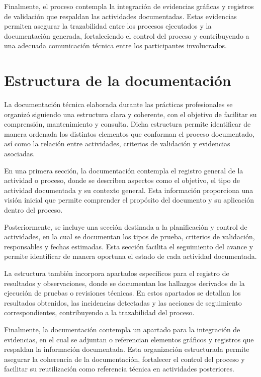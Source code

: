 \documentclass[12pt]{article}
\begin{document}
Finalmente, el proceso contempla la integración de evidencias gráficas y registros de validación que respaldan las actividades documentadas. Estas evidencias permiten asegurar la trazabilidad entre los procesos ejecutados y la documentación generada, fortaleciendo el control del proceso y contribuyendo a una adecuada comunicación técnica entre los participantes involucrados.


\section*{Estructura de la documentación}

La documentación técnica elaborada durante las prácticas profesionales se organizó siguiendo una estructura clara y coherente, con el objetivo de facilitar su comprensión, mantenimiento y consulta. Dicha estructura permite identificar de manera ordenada los distintos elementos que conforman el proceso documentado, así como la relación entre actividades, criterios de validación y evidencias asociadas.

En una primera sección, la documentación contempla el registro general de la actividad o proceso, donde se describen aspectos como el objetivo, el tipo de actividad documentada y su contexto general. Esta información proporciona una visión inicial que permite comprender el propósito del documento y su aplicación dentro del proceso.

Posteriormente, se incluye una sección destinada a la planificación y control de actividades, en la cual se documentan los tipos de prueba, criterios de validación, responsables y fechas estimadas. Esta sección facilita el seguimiento del avance y permite identificar de manera oportuna el estado de cada actividad documentada.

La estructura también incorpora apartados específicos para el registro de resultados y observaciones, donde se documentan los hallazgos derivados de la ejecución de pruebas o revisiones técnicas. En estos apartados se detallan los resultados obtenidos, las incidencias detectadas y las acciones de seguimiento correspondientes, contribuyendo a la trazabilidad del proceso.

Finalmente, la documentación contempla un apartado para la integración de evidencias, en el cual se adjuntan o referencian elementos gráficos y registros que respaldan la información documentada. Esta organización estructurada permite asegurar la coherencia de la documentación, fortalecer el control del proceso y facilitar su reutilización como referencia técnica en actividades posteriores.
\end{document}
